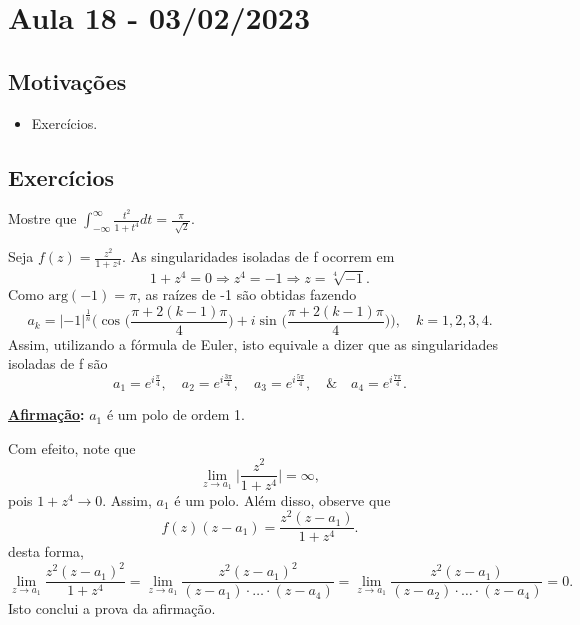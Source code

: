 \documentclass[complex.tex]{subfiles}
\begin{document}
\section{Aula 18 - 03/02/2023}
\subsection{Motivações}
\begin{itemize}
	\item Exercícios.
\end{itemize}
\subsection{Exercícios}
\begin{exer*}
	Mostre que \(\int_{-\infty}^{\infty}\frac{t^{2}}{1+t^{4}}dt = \frac{\pi }{\sqrt[]{2}}\).

	Seja \(f(z) = \frac{z^{2}}{1+z^{4}}.\) As singularidades isoladas de f ocorrem em
	\[
		1 + z^{4} = 0 \Rightarrow z^{4} = -1 \Rightarrow z = \sqrt[4]{-1}.
	\]
	Como \(\mathrm{arg}(-1) = \pi \), as raízes de -1 são obtidas fazendo
	\[
		a_{k} = |-1|^{\frac{1}{n}}\biggl(\cos^{}{\biggl(\frac{\pi + 2(k-1)\pi }{4}\biggr)} + i\sin^{}{\biggl(\frac{\pi + 2(k-1)\pi }{4}\biggr)}\biggr),\quad k=1, 2, 3, 4.
	\]
	Assim, utilizando a fórmula de Euler, isto equivale a dizer que as singularidades isoladas de f são
	\[
		a_{1} = e^{i \frac{\pi }{4}},\quad a_{2} = e^{i \frac{3\pi }{4}},\quad a_3=e^{i \frac{5\pi }{4}},\quad\&\quad a_{4}=e^{i \frac{7\pi }{4}}.
	\]

	\textbf{\underline{Afirmação}:} \(a_{1}\) é um polo de ordem 1.

	Com efeito, note que
	\[
		\lim_{z\to a_{1}}\biggl\vert \frac{z^{2}}{1+z^{4}} \biggr\vert = \infty,
	\]
	pois \(1 + z^{4}\to 0\). Assim, \(a_{1}\) é um polo. Além disso, observe que
	\[
		f(z)(z-a_1) = \frac{z^{2}(z-a_{1})}{1 + z^{4}}.
	\]
	desta forma,
	\[
		\lim_{z\to a_{1}}\frac{z^{2}(z-a_{1})^{2}}{1+z^{4}}=\lim_{z\to a_{1}}\frac{z^{2}(z-a_{1})^{2}}{(z-a_{1})\cdot \dotsc \cdot (z-a_{4})} = \lim_{z\to a_{1}}\frac{z^{2}(z-a_{1})}{(z-a_{2})\cdot \dotsc \cdot (z-a_{4})} = 0.
	\]
	Isto conclui a prova da afirmação.


\end{exer*}
\end{document}
